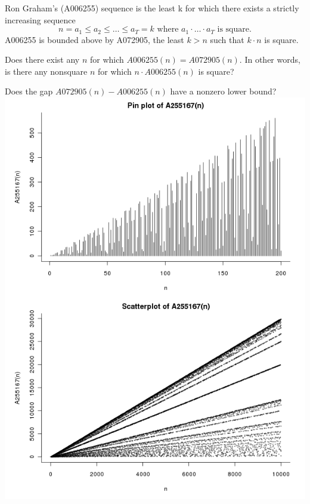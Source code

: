 \documentclass{article}
\begin{document}
  Ron Graham's (A006255) sequence is the least k for which there exists a
  strictly increasing sequence \[
    n = a_1 \leq a_2 \leq \hdots \leq a_T = k \text{ where }
    a_1 \cdot\hdots\cdot a_T \text{ is square.}
  \]
  A006255 is bounded above by A072905, the least $k > n$ such that $k\cdot n$
  is square.

\begin{question}
  Does there exist any $n$ for which $A006255(n) = A072905(n)$. In other words,
  is there any nonsquare $n$ for which $n \cdot A006255(n)$ is square?
\end{question}

\begin{related}
  \item Does the gap $A072905(n) - A006255(n)$ have a nonzero lower bound?\\
    \includegraphics[trim={0cm 0 0 14cm},clip,scale=0.7]{assets/018_problem_A255167}

\end{related}
\end{document}
